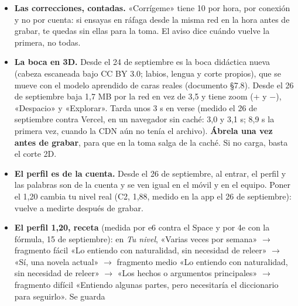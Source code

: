 \documentclass[11pt,a4paper]{article}
\begin{document}
\begin{itemize}
        \texttt{"buscador\_listo": true}. Si no lo dice, espera con esa pestaña abierta
        de uno a minuto y medio, sin recargar en bucle; si a los dos minutos no
        responde, abre la página del Space y mira si pone \texttt{Error}. La primera
        búsqueda tras el arranque va más lenta y la siguiente responde en unos
        0,3~s. El \emph{front} es estático y se pinta en 0,64~s, pero lo demás
        espera a la API. Las cifras son de arranques por despliegue, no de un
        despertar desde la suspensión, que no se ha medido
        (\texttt{auditoria/\allowbreak ronda4\_arranque\_demo\_f4\_-09-16.md}).
  \item \textbf{Las correcciones, contadas.} «Corrígeme» tiene 10 por hora, por conexión y
        no por cuenta: si ensayas en ráfaga desde la misma red en la hora antes de grabar,
        te quedas sin ellas para la toma. El aviso dice cuándo vuelve la primera, no todas.
  \item \textbf{La boca en 3D.} Desde el 24 de septiembre es la boca didáctica nueva
        (cabeza escaneada bajo CC BY 3.0; labios, lengua y corte propios), que se mueve
        con el modelo aprendido de caras reales (documento §7.8). Desde el 26 de
        septiembre baja 1,7 MB por la red en vez de 3,5 y tiene zoom (+ y $-$),
        «Despacio» y «Explorar». Tarda unos 3 s en verse (medido el 26 de septiembre
        contra Vercel, en un navegador sin caché: 3,0 y 3,1 s; 8,9 s la primera vez,
        cuando la CDN aún no tenía el archivo). \textbf{Ábrela una vez antes de
        grabar}, para que en la toma salga de la caché. Si no carga, basta el corte 2D.
  \item \textbf{El perfil es de la cuenta.} Desde el 26 de septiembre, al entrar, el
        perfil y las palabras son de la cuenta y se ven igual en el móvil y en el equipo.
        Poner el 1,20 cambia tu nivel real (C2, 1,88, medido en la app el 26 de
        septiembre): vuelve a medirte después de grabar.
  \item \textbf{El perfil 1,20, receta} (medida por e6 contra el Space y por 4e con
        la fórmula, 15 de septiembre): en \emph{Tu nivel}, «Varias veces por semana»
        $\rightarrow$ fragmento fácil «Lo entiendo con naturalidad, sin necesidad de
        releer» $\rightarrow$ «Sí, una novela actual» $\rightarrow$ fragmento medio
        «Lo entiendo con naturalidad, sin necesidad de releer» $\rightarrow$ «Los
        hechos o argumentos principales» $\rightarrow$ fragmento difícil «Entiendo
        algunas partes, pero necesitaría el diccionario para seguirlo». Se guarda

\end{itemize}
\end{document}
